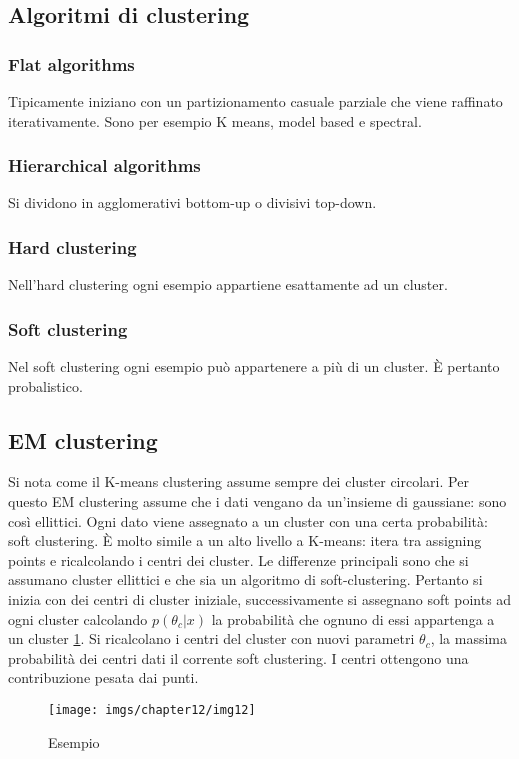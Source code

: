 	\subsection{Algoritmi di clustering}

		\subsubsection{Flat algorithms}
		Tipicamente iniziano con un partizionamento casuale parziale che viene raffinato iterativamente.
		Sono per esempio K means, model based e spectral.
		
		\subsubsection{Hierarchical algorithms}
		Si dividono in agglomerativi bottom-up o divisivi top-down.
		
		\subsubsection{Hard clustering}
		Nell'hard clustering ogni esempio appartiene esattamente ad un cluster.
		
		\subsubsection{Soft clustering}
		Nel soft clustering ogni esempio pu\`o appartenere a pi\`u di un cluster.
		\`E pertanto probalistico.

	\subsection{EM clustering}
	Si nota come il K-means clustering assume sempre dei cluster circolari.
	Per questo EM clustering assume che i dati vengano da un'insieme di gaussiane: sono cos\`i ellittici.
	Ogni dato viene assegnato a un cluster con una certa probabilit\`a: soft clustering.
	\`E molto simile a un alto livello a K-means: itera tra assigning points e ricalcolando i centri dei cluster.
	Le differenze principali sono che si assumano cluster ellittici e che sia un algoritmo di soft-clustering.
	Pertanto si inizia con dei centri di cluster iniziale, successivamente si assegnano soft points ad ogni cluster calcolando $p(\theta_c|x)$ la probabilit\`a che ognuno di essi appartenga a un cluster \ref{fig:chapter12-12}.
	Si ricalcolano i centri del cluster con nuovi parametri $\theta_c$, la massima probabilit\`a dei centri dati il corrente soft clustering.
	I centri ottengono una contribuzione pesata dai punti.
	\begin{figure}
		\centering
		\texttt{[image: imgs/chapter12/img12]}
		\caption{Esempio}
		\label{fig:chapter12-12}
	\end{figure}

